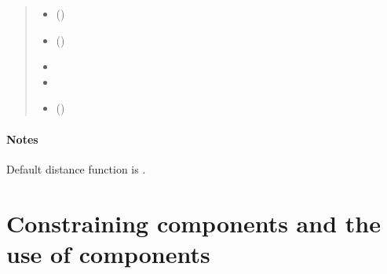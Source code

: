 \documentclass[letterpaper,10pt,english]{sphinxmanual}
\begin{document}
\begin{fulllineitems}
\begin{quote}
\begin{description}
\begin{itemize}
\item {} 
\sphinxAtStartPar
{}\sphinxstyleliteralstrong{\sphinxupquote{(}} (\sphinxstyleliteralemphasis{\sphinxupquote{*}}) \textendash{} 

\item {} 
\sphinxAtStartPar
{}\sphinxstyleliteralstrong{\sphinxupquote{(}} (\sphinxstyleliteralemphasis{\sphinxupquote{) }}\sphinxstyleliteralemphasis{\sphinxupquote{=}}) \textendash{} 

\item {} 
\sphinxAtStartPar
{}\sphinxstyleliteralstrong{\sphinxupquote{)}} \textendash{} 

\item {} 
\sphinxAtStartPar
{}\sphinxstyleliteralstrong{\sphinxupquote{(}} \textendash{} 

\item {} 
\sphinxAtStartPar
{} (\sphinxstyleliteralemphasis{\sphinxupquote{) }}) \textendash{} 

\end{itemize}

\end{description}\end{quote}
\subsubsection*{Notes}

\sphinxAtStartPar
Default distance function is .

\end{fulllineitems}


\sphinxstepscope


\chapter{Constraining components and the use of components}
\label{\detokenize{components_constrained_use:constraining-components-and-the-use-of-components}}\label{\detokenize{components_constrained_use::doc}}
\end{document}
